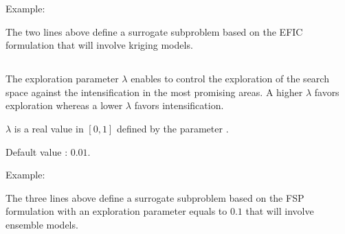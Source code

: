 \documentclass[letterpaper,10pt,english]{sphinxmanual}
\begin{document}
\begin{DUlineblock}{0em}
\item[] Example:
\item[] 
\item[] 
\item[] The two lines above define a surrogate subproblem based on the EFIC formulation that will involve kriging models.
\end{DUlineblock}


\subsection{}
\label{\detokenize{SgteLib:sgtelib-model-diversification}}
\begin{DUlineblock}{0em}
\item[] The exploration parameter \(\lambda\) enables to control the exploration of the search space against the intensification in the most promising areas. A higher \(\lambda\) favors exploration whereas a lower \(\lambda\) favors intensification.
\end{DUlineblock}

\begin{DUlineblock}{0em}
\item[] \(\lambda\) is a real value in \([0,1]\) defined by the parameter .
\item[] Default value : \(0.01\).
\end{DUlineblock}

\begin{DUlineblock}{0em}
\item[] Example:
\item[] 
\item[] 
\item[] 
\item[] The three lines above define a surrogate subproblem based on the FSP formulation with an exploration parameter equals to \(0.1\) that will involve ensemble models.
\end{DUlineblock}

\begin{sphinxShadowBox}
\end{sphinxShadowBox}
\end{document}
